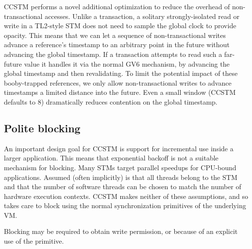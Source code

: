 CCSTM performs a novel additional optimization to reduce the overhead
of non-transactional accesses.  Unlike a transaction, a solitary
strongly-isolated read or write in a TL2-style STM does not need to
sample the global clock to provide opacity.  This means that we can let
a sequence of non-transactional writes advance a reference's timestamp to
an arbitrary point in the future without advancing the global timestamp.
If a transaction attempts to read such a far-future value it handles
it via the normal GV6 mechanism, by advancing the global timestamp and
then revalidating.  To limit the potential impact of these booby-trapped
references, we only allow non-transactional writes to advance timestamps
a limited distance into the future.  Even a small window (CCSTM defaults
to 8) dramatically reduces contention on the global timestamp.

\subsection{Polite blocking}

An important design goal for CCSTM is support for incremental use inside
a larger application.  This means that exponential backoff is not a
suitable mechanism for blocking.  Many STMs target parallel speedups
for CPU-bound applications.  Assumed (often implicitly) is that all
threads belong to the STM and that the number of software threads can be
chosen to match the number of hardware execution contexts.  CCSTM makes
neither of these assumptions, and so takes care to block using the normal
synchronization primitives of the underlying VM.

Blocking may be required to obtain write permission, or because of an
explicit use of the  primitive.
